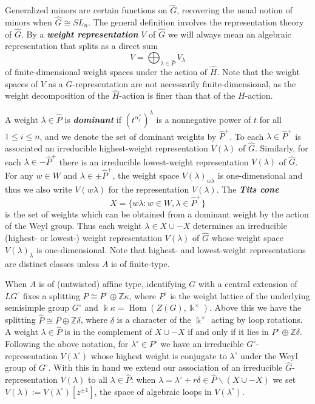 \documentclass[12pt]{amsart}
\newcommand{\newword}[1]{\textbf{\emph{#1}}}
\newcommand{\ZZ}{\mathbb{Z}}
\newcommand{\kk}{\Bbbk}
\DeclareMathOperator{\Hom}{Hom}
\newcommand{\loopvar}{z}
\theoremstyle{remark}
\numberwithin{equation}{section}
\numberwithin{figure}{section}
\begin{document}
Generalized minors are certain functions on $\widehat{G}$, recovering the usual notion of minors when $\widehat{G} \cong SL_n$.
The general definition involves the representation theory of $\widehat{G}$.
By a \newword{weight representation} $V$ of $\widehat{G}$ we will always mean an algebraic representation that splits as a direct sum
\[
  V = \bigoplus_{\lambda \in \widehat{P}} V_\lambda
\]
of finite-dimensional weight spaces under the action of $\widehat{H}$.
Note that the weight spaces of $V$ as a $G$-representation are not necessarily finite-dimensional, as the weight decomposition of the $\widehat{H}$-action is finer than that of the $H$-action.

A weight $\lambda \in \widehat{P}$ is \newword{dominant} if $(t^{\alpha_i^\vee})^\lambda$ is a nonnegative power of $t$ for all $1 \leq i \leq n$, and we denote the set of dominant weights by $\widehat{P}^+$.
To each $\lambda \in \widehat{P}^+$ is associated an irreducible highest-weight representation $V(\lambda)$ of $\widehat{G}$.
Similarly, for each $\lambda \in -\widehat{P}^+$ there is an irreducible lowest-weight representation $V(\lambda)$ of $\widehat{G}$.
For any $w\in W$ and $\lambda\in\pm\widehat{P}^+$, the weight space $V(\lambda)_{w\lambda}$ is one-dimensional and thus we also write $V(w\lambda)$ for the representation $V(\lambda)$.
The \newword{Tits cone} $$X = \{w\lambda : w \in W, \lambda \in \widehat{P}^+\}$$ is the set of weights which can be obtained from a dominant weight by the action of the Weyl group.
Thus each weight $\lambda\in X \cup -X$ determines an irreducible (highest- or lowest-) weight representation $V(\lambda)$ of $\widehat{G}$ whose weight space $V(\lambda)_\lambda$ is one-dimensional.
Note that highest- and lowest-weight representations are distinct classes unless $A$ is of finite-type.

When $A$ is of (untwisted) affine type, identifying $G$ with a central extension of $LG^\circ$ fixes a splitting $P \cong P^\circ \oplus \ZZ \kappa$, where $P^\circ$ is the weight lattice of the underlying semisimple group $G^\circ$ and $\kk \kappa = \Hom( Z(G),\kk^\times)$.
Above this we have the splitting $\widehat{P} \cong P \oplus \ZZ \delta$, where $\delta$ is a character of the $\kk^\times$ acting by loop rotations.
A weight $\lambda \in \widehat{P}$ is in the complement of $X \cup -X$ if and only if it lies in $P^\circ \oplus \ZZ \delta$.
Following the above notation, for $\lambda^\circ\in P^\circ$ we have an irreducible $G^\circ$-representation $V(\lambda^\circ)$ whose highest weight is conjugate to $\lambda^\circ$ under the Weyl group of $G^\circ$.
With this in hand we extend our association of an irreducible $\widehat{G}$-representation $V(\lambda)$ to all $\lambda \in \widehat{P}$: when $\lambda=\lambda^\circ+r\delta\in \widehat{P} \smallsetminus(X \cup -X)$ we set $V(\lambda) := V(\lambda^\circ)[\loopvar^{\pm 1}]$, the space of algebraic loops in $V(\lambda^\circ)$.
\end{document}
